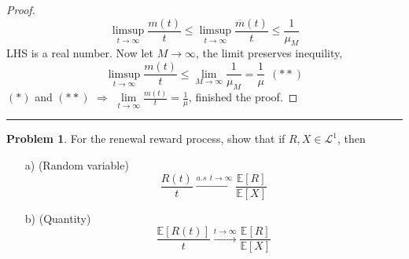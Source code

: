 \documentclass[a4paper, 10pt]{article}
\theoremstyle{definition}
\newtheorem{problem}{Problem}
\theoremstyle{hSol}
\begin{document}
\begin{proof}
\begin{equation}
  \limsup\limits_{t\rightarrow\infty}\frac{m(t)}{t} \leq \limsup\limits_{t\rightarrow\infty}\frac{\overline{m}(t)}{t} \leq \frac{1}{\mu_M}
\end{equation}
LHS is a real number. Now let $M\to \infty$, the limit preserves inequility,
\begin{equation}
  \limsup\limits_{t\rightarrow\infty}\frac{m(t)}{t} \leq \lim\limits_{M\rightarrow\infty}\frac{1}{\mu_M} = \frac{1}{\mu}~~(**)
\end{equation}
$(*)$ and $(**)$ $\Rightarrow$ $\lim\limits_{t\rightarrow\infty}\frac{m(t)}{t}=\frac{1}{\mu}$, finished the proof.
\end{proof}

\noindent\rule{16cm}{0.4pt}
\begin{problem} For the renewal reward process, show that if $R,X\in \mathcal{L}^1$, then
\begin{itemize}
  \item[a)] (Random variable)
  $$\frac{R(t)}{t}\xrightarrow{a.s~~t\to \infty}\frac{\mathbb{E}\left[R\right]}{\mathbb{E}\left[X\right]}$$
  \item[b)] (Quantity)
  $$\frac{\mathbb{E}\left[R(t)\right]}{t}\xrightarrow{t\to \infty}\frac{\mathbb{E}\left[R\right]}{\mathbb{E}\left[X\right]}$$
\end{itemize}
\end{problem}
\end{document}
